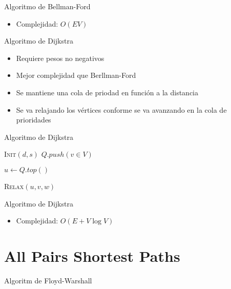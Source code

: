 \documentclass[]{beamer}
\begin{document}
\begin{frame}{Algoritmo de Bellman-Ford}
  \begin{itemize}
    \item Complejidad: $O(EV)$
  \end{itemize}
\end{frame}

\begin{frame}{Algoritmo de Dijkstra}
  \begin{itemize}
    \item Requiere pesos no negativos
      \pause
    \item Mejor complejidad que Berllman-Ford
      \pause
    \item Se mantiene una cola de priodad en funci\'on a la distancia
      \pause
    \item Se va relajando los v\'ertices conforme se va avanzando en la cola de prioridades
  \end{itemize}
\end{frame}

\begin{frame}{Algoritmo de Dijkstra}
  \begin{algorithm}[H]
    \textsc{Init}$(d,s)$
    $Q.push(v \in V)$

    {
      {$u \gets Q.top()$}

      {
        \textsc{Relax}$(u,v,w)$
      }
    }
  \end{algorithm}
\end{frame}

\begin{frame}{Algoritmo de Dijkstra}
  \begin{itemize}
    \item Complejidad: $O(E + V \log V)$
  \end{itemize}
\end{frame}

\section{All Pairs Shortest Paths}
\begin{frame}{Algoritm de Floyd-Warshall}
\end{frame}
\end{document}
